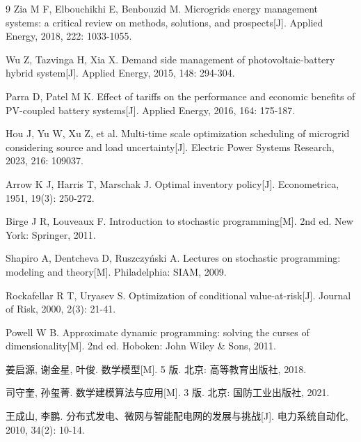 \documentclass[withoutpreface]{cumcmthesis}
\begin{document}
\clearpage
\begin{thebibliography}{9}
  Zia M F, Elbouchikhi E, Benbouzid M. Microgrids energy management systems:
  a critical review on methods, solutions, and prospects[J].
  Applied Energy, 2018, 222: 1033-1055.

  Wu Z, Tazvinga H, Xia X. Demand side management of photovoltaic-battery
  hybrid system[J]. Applied Energy, 2015, 148: 294-304.

  Parra D, Patel M K. Effect of tariffs on the performance and economic
  benefits of PV-coupled battery systems[J]. Applied Energy, 2016, 164: 175-187.

  Hou J, Yu W, Xu Z, et al. Multi-time scale optimization scheduling of
  microgrid considering source and load uncertainty[J].
  Electric Power Systems Research, 2023, 216: 109037.

  Arrow K J, Harris T, Marschak J. Optimal inventory policy[J].
  Econometrica, 1951, 19(3): 250-272.

  Birge J R, Louveaux F. Introduction to stochastic programming[M].
  2nd ed. New York: Springer, 2011.

  Shapiro A, Dentcheva D, Ruszczyński A. Lectures on stochastic programming:
  modeling and theory[M]. Philadelphia: SIAM, 2009.

  Rockafellar R T, Uryasev S. Optimization of conditional value-at-risk[J].
  Journal of Risk, 2000, 2(3): 21-41.

  Powell W B. Approximate dynamic programming: solving the curses of
  dimensionality[M]. 2nd ed. Hoboken: John Wiley \& Sons, 2011.

  姜启源, 谢金星, 叶俊. 数学模型[M]. 5 版. 北京: 高等教育出版社, 2018.

  司守奎, 孙玺菁. 数学建模算法与应用[M]. 3 版. 北京: 国防工业出版社, 2021.

  王成山, 李鹏. 分布式发电、微网与智能配电网的发展与挑战[J].
  电力系统自动化, 2010, 34(2): 10-14.
\end{thebibliography}
\end{document}

